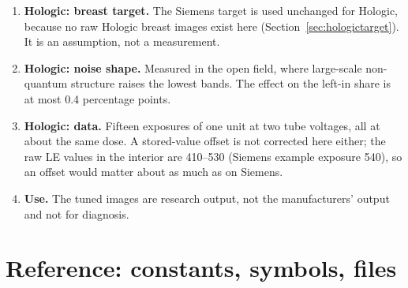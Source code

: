 \documentclass[11pt,a4paper]{article}
\begin{document}
\begin{enumerate}
are left out of the measurement, but the spots stay in the image.
\item \textbf{Hologic: breast target.} The Siemens target is used unchanged for Hologic, because no raw Hologic breast
images exist here (Section~\ref{sec:hologictarget}). It is an assumption, not a measurement.
\item \textbf{Hologic: noise shape.} Measured in the open field, where large-scale non-quantum structure raises the lowest
bands. The effect on the left-in share is at most 0.4 percentage points.
\item \textbf{Hologic: data.} Fifteen exposures of one unit at two tube voltages, all at about the same dose. A
stored-value offset is not corrected here either; the raw LE values in the interior are 410--530 (Siemens example
exposure 540), so an offset would matter about as much as on Siemens.
\item \textbf{Use.} The tuned images are research output, not the manufacturers' output and not for diagnosis.
\end{enumerate}

\section{Reference: constants, symbols, files}
\end{document}
